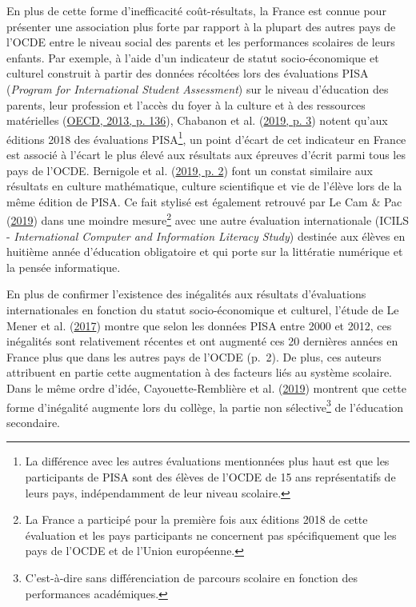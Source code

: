 \documentclass[
]{book}
\begin{document}
\quad En plus de cette forme d'inefficacité coût-résultats, la France est connue pour présenter une association plus forte par rapport à la plupart des autres pays de l'OCDE entre le niveau social des parents et les performances scolaires de leurs enfants. Par exemple, à l'aide d'un indicateur de statut socio-économique et culturel construit à partir des données récoltées lors des évaluations PISA (\emph{Program for International Student Assessment}) sur le niveau d'éducation des parents, leur profession et l'accès du foyer à la culture et à des ressources matérielles (\protect\hyperlink{ref-OEC:13}{OECD, 2013, p. 136}), Chabanon et al. (\protect\hyperlink{ref-CHA:eal:19}{2019, p. 3}) notent qu'aux éditions 2018 des évaluations PISA\footnote{La différence avec les autres évaluations mentionnées plus haut est que les participants de PISA sont des élèves de l'OCDE de 15 ans représentatifs de leurs pays, indépendamment de leur niveau scolaire.}, un point d'écart de cet indicateur en France est associé à l'écart le plus élevé aux résultats aux épreuves d'écrit parmi tous les pays de l'OCDE. Bernigole et al. (\protect\hyperlink{ref-BER:eal:19}{2019, p. 2}) font un constat similaire aux résultats en culture mathématique, culture scientifique et vie de l'élève lors de la même édition de PISA. Ce fait stylisé est également retrouvé par Le Cam \& Pac (\protect\hyperlink{ref-LEC:PAC:19}{2019}) dans une moindre mesure\footnote{La France a participé pour la première fois aux éditions 2018 de cette évaluation et les pays participants ne concernent pas spécifiquement que les pays de l'OCDE et de l'Union européenne.} avec une autre évaluation internationale (ICILS - \emph{International Computer and Information Literacy Study}) destinée aux élèves en huitième année d'éducation obligatoire et qui porte sur la littératie numérique et la pensée informatique.

En plus de confirmer l'existence des inégalités aux résultats d'évaluations internationales en fonction du statut socio-économique et culturel, l'étude de Le Mener et al. (\protect\hyperlink{ref-LEM:eal:17}{2017}) montre que selon les données PISA entre 2000 et 2012, ces inégalités sont relativement récentes et ont augmenté ces 20 dernières années en France plus que dans les autres pays de l'OCDE (p.~2). De plus, ces auteurs attribuent en partie cette augmentation à des facteurs liés au système scolaire. Dans le même ordre d'idée, Cayouette-Remblière et al. (\protect\hyperlink{ref-CAY:19}{2019}) montrent que cette forme d'inégalité augmente lors du collège, la partie non sélective\footnote{C'est-à-dire sans différenciation de parcours scolaire en fonction des performances académiques.} de l'éducation secondaire.
\end{document}
